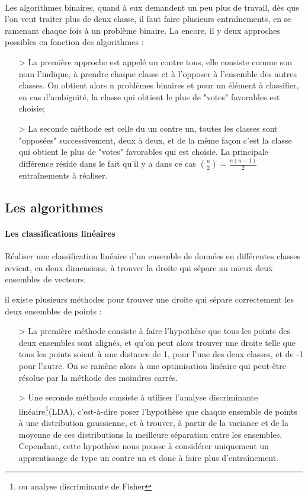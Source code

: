\documentclass[a4paper,10pt]{report}
\begin{document}
\paragraph{}
Les algorithmes binaires, quand à eux demandent un peu plus de travail, dès que l'on veut traiter plus de deux classe, il faut faire plusieurs entraînements, en se ramenant chaque fois à un problème binaire. La encore, il y deux approches possibles en fonction des algorithmes :
 \begin{itemize}
   \item[>] La première approche est appelé un contre tous, elle consiste comme son nom l'indique, à prendre chaque classe et à l'opposer à l'ensemble des autres classes. On obtient alors n problèmes binaires et pour un élément à classifier, en cas d'ambiguïté, la classe qui obtient le plus de "votes" favorables est choisie;
   \item[>] La seconde méthode est celle du un contre un, toutes les classes sont "opposées" successivement, deux à deux, et de la même façon c'est la classe qui obtient le plus de "votes" favorables qui est choisie. La principale différence réside dans le fait qu'il y a dans ce cas ${n \choose 2}=\frac{n(n-1)}{2}$ entraînements à réaliser.
 \end{itemize}
 \subsection{Les algorithmes}
\paragraph{Les classifications linéaires\\}
Réaliser une classification linéaire d'un ensemble de données en différentes classes revient, en deux dimensions, à trouver la droite qui sépare au mieux deux ensembles de vecteurs.

il existe plusieurs méthodes pour trouver une droite qui sépare correctement les deux ensembles de points :
\begin{itemize}
  \item[>] La première méthode consiste à faire l'hypothèse que tous les points des deux ensembles sont alignés, et qu'on peut alors trouver une droite telle que tous les points soient à une distance de 1, pour l'une des deux classes, et de -1 pour l'autre. On se ramène alors à une optimisation linéaire qui peut-être résolue par la méthode des moindres carrés.
  \item[>] Une seconde méthode consiste à utiliser l'analyse discriminante linéaire\footnote{ou analyse discriminante de Fisher}(LDA), c'est-à-dire poser l'hypothèse que chaque ensemble de points à une distribution gaussienne, et à trouver, à partir de la variance et de la moyenne de ces distributions la meilleure séparation entre les ensembles. Cependant, cette hypothèse nous pousse à considérer uniquement un apprentissage de type un contre un et donc à faire plus d'entraînement.
\end{itemize}
\end{document}
